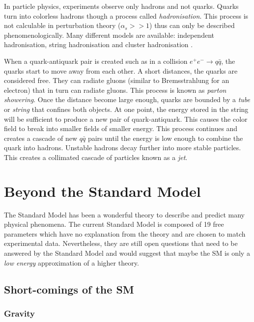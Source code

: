 In particle physics, experiments observe only hadrons and not quarks. Quarks turn into colorless hadrons though a process called \textit{hadronisation}. This process is not calculable in perturbation theory ($\alpha_s >> 1$) thus can only be described phenomenologically. Many different models are available: independent hadronisation, string hadronisation \cite{Artru1988} and cluster hadronisation \cite{Webber:1983if}.

When a quark-antiquark pair is created such as in a collision $e^+e^- \rightarrow q\bar{q}$, the quarks start to move away from each other. A short distances, the quarks are considered free. They can radiate gluons (similar to Bremsstrahlung for an electron) that in turn can radiate gluons. This process is known as \textit{parton showering}. Once the distance become large enough, quarks are bounded by a \textit{tube} or \textit{string} that confines both objects. At one point, the energy stored in the string will be sufficient to produce a new pair of quark-antiquark. This causes the color field to break into smaller fields of smaller energy. This process continues and creates a cascade of new $q\bar{q}$ pairs until the energy is low enough to combine the quark into hadrons. Unstable hadrons decay further into more stable particles. This creates a collimated cascade of particles known as a \textit{jet}.

\section{Beyond the Standard Model}
\label{sec:BeyondSM}

The Standard Model has been a wonderful theory to describe and predict many physical phenomena. The current Standard Model is composed of 19 free parameters which have no explanation from the theory and are chosen to match experimental data. Nevertheless, they are still open questions that need to be answered by the Standard Model and would suggest that maybe the SM is only a \textit{low energy} approximation of a higher theory.

\subsection{Short-comings of the SM}

\subsubsection*{Gravity}

